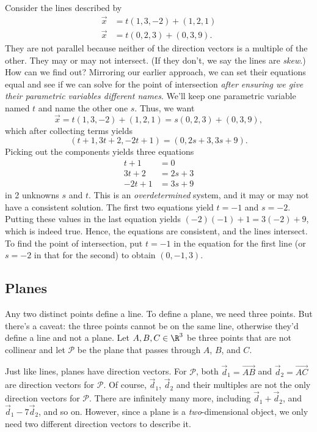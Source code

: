 \begin{example}
Consider the lines described by
\begin{align*}
	\vec x &= t(1, 3, -2 ) + ( 1, 2, 1 ) \\
	\vec x &= t( 0, 2, 3) + ( 0, 3, 9 ).
\end{align*}
They are not parallel because neither of the direction
vectors is a multiple
of the other.  They may or may not intersect.  (If they don't,
	we say the lines are \emph{skew}.)  How can we find out?
	Mirroring our earlier approach,
	we can set their equations equal and see if we can solve for the point
	of intersection \emph{after ensuring we give their parametric variables
	different names}.   We'll keep one parametric variable named $t$ and name the
	other one $s$.  Thus, we want
\[
\vec x = t( 1, 3, -2 ) + ( 1, 2, 1 ) =
s( 0, 2, 3) + ( 0, 3, 9 ),
\]
which after collecting terms yields
\[
    ( t + 1, 3t + 2, -2t + 1 ) = ( 0, 2s + 3, 3s + 9).
\]
Picking out the components yields three equations
\begin{align*}
    t + 1 &= 0 \\
    3t +2 &= 2s + 3 \\
    -2t + 1 &=  3s + 9
\end{align*}
in 2 unknowns  $s$ and $t$.  This is an {\it overdetermined\/}
system, and it may or may not have a consistent solution.
The first two equations yield $t = -1$  and $s = -2$.  Putting
these values in the last equation yields $(-2)(-1) + 1 = 3(-2) + 9$,
which is indeed true.
Hence, the equations are consistent, and the lines
intersect.   To find the point of intersection, put $t = -1$
in the equation for the first line (or
$s = -2$ in that for the second) to obtain  $( 0, -1, 3 )$.
\end{example}

\subsection{Planes}

Any two distinct points define a line.  To define a plane, we
need three points.  But there's a caveat: the three points cannot
be on the same line, otherwise they'd define a line
and not a plane.  Let $A,B,C\in\R^3$ be three points that are not
collinear and let $\mathcal P$ be the plane that passes through $A$,
$B$, and $C$.

Just like lines, planes have direction vectors.  For $\mathcal P$, both
$\vec d_1=\overrightarrow{AB}$ and $\vec d_2=\overrightarrow{AC}$ are direction
vectors for $\mathcal P$.  Of course, $\vec d_1$, $\vec d_2$ and their multiples
are not the only direction vectors for $\mathcal P$. There are infinitely many more, including
$\vec d_1+\vec d_2$, and $\vec d_1-7\vec d_2$, and so on.  However, since a plane
is a \emph{two}-dimensional object, we only need two different direction vectors to describe it.

